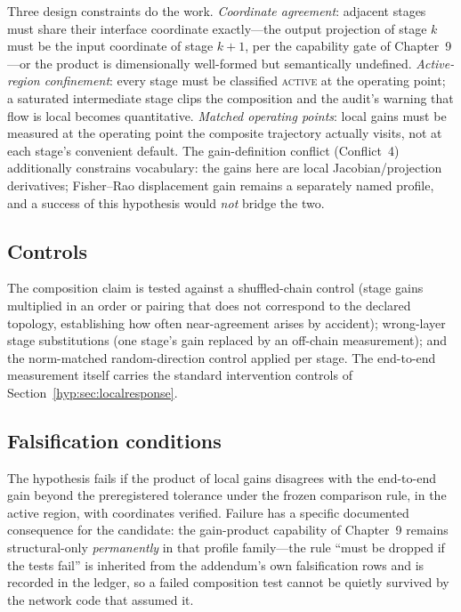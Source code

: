 Three design constraints do the work. \emph{Coordinate agreement}: adjacent stages must share their interface coordinate exactly---the output projection of stage $k$ must be the input coordinate of stage $k{+}1$, per the capability gate of Chapter~9---or the product is dimensionally well-formed but semantically undefined. \emph{Active-region confinement}: every stage must be classified \textsc{active} at the operating point; a saturated intermediate stage clips the composition and the audit's warning that flow is local becomes quantitative. \emph{Matched operating points}: local gains must be measured at the operating point the composite trajectory actually visits, not at each stage's convenient default. The gain-definition conflict (Conflict~4) additionally constrains vocabulary: the gains here are local Jacobian/projection derivatives; Fisher--Rao displacement gain remains a separately named profile, and a success of this hypothesis would \emph{not} bridge the two.

\subsection{Controls}

The composition claim is tested against a shuffled-chain control (stage gains multiplied in an order or pairing that does not correspond to the declared topology, establishing how often near-agreement arises by accident); wrong-layer stage substitutions (one stage's gain replaced by an off-chain measurement); and the norm-matched random-direction control applied per stage. The end-to-end measurement itself carries the standard intervention controls of Section~\ref{hyp:sec:localresponse}.

\subsection{Falsification conditions}

The hypothesis fails if the product of local gains disagrees with the end-to-end gain beyond the preregistered tolerance under the frozen comparison rule, in the active region, with coordinates verified. Failure has a specific documented consequence for the candidate: the gain-product capability of Chapter~9 remains structural-only \emph{permanently} in that profile family---the rule ``must be dropped if the tests fail'' is inherited from the addendum's own falsification rows and is recorded in the ledger, so a failed composition test cannot be quietly survived by the network code that assumed it.

